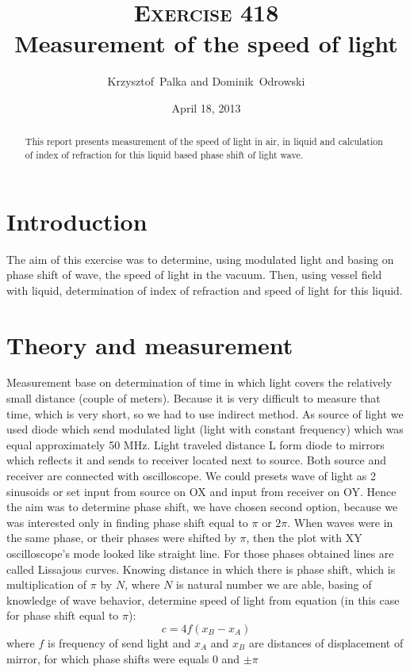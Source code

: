 \documentclass[a4paper,12pt]{article}
\author{Krzysztof~Palka and Dominik~Odrowski}
\date{April 18, 2013}
\title{\textsc{Exercise} 418 \\ Measurement of the speed of light}
\begin{document}
    \maketitle

    \begin{abstract}
        This report presents measurement of the speed of light in air, in liquid and calculation of index of refraction for this liquid based phase shift of light wave.
    \end{abstract}

    \section{Introduction}
    The aim of this exercise was to determine, using modulated light and basing on phase shift of wave, the speed of light in the vacuum. Then, using vessel field with liquid, determination of index of refraction and speed of light for this liquid.   

    \section{Theory and measurement}
    Measurement base on determination of time in which light covers the relatively small distance (couple of meters). Because it is very difficult to measure that time, which is very short, so we had to use indirect method.
    As source of light we used diode which send modulated light (light with constant frequency) which was equal approximately 50 MHz. Light traveled distance L form diode to mirrors which reflects it and sends to receiver located next to source. Both source and receiver are connected with oscilloscope. We could presets wave of light as 2 sinusoids or set input from source on OX and input from receiver on OY. Hence the aim was to determine phase shift, we have chosen second option, because we was interested only in finding phase shift equal to $\pi$ or $2 \pi$. When waves were in the same phase, or their phases were shifted by $\pi$, then the plot with XY oscilloscope's mode looked like straight line. For those phases obtained lines are called Lissajous curves.
    Knowing distance in which there is phase shift, which is multiplication of $\pi$ by $N$, where $N$ is natural number we are able, basing of knowledge of wave behavior, determine speed of light from equation (in this case for phase shift equal to $\pi$):
    \begin{equation}
        c = 4 f (x_B - x_A) \label{eq:c}
    \end{equation}
    where $f$ is frequency of send light and $x_A$ and $x_B$ are distances of displacement of mirror, for which phase shifts were equals 0 and $\pm \pi$ 
\end{document}
